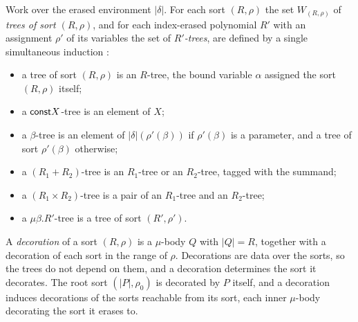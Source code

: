 \begin{definition}
\label{def:polynomial-types:trees}
Work over the erased environment $|\delta|$. For each sort $(R, \rho)$ the set $W_{(R,\rho)}$ of
\emph{trees of sort $(R, \rho)$}, and for each index-erased polynomial $R'$ with an assignment $\rho'$
of its variables the set of \emph{$R'$-trees}, are defined by a single simultaneous induction
\citep{abbott2004}:
\begin{itemize}
\item a tree of sort $(R, \rho)$ is an $R$-tree, the bound variable $\alpha$ assigned the sort
  $(R, \rho)$ itself;
\item a $\mathsf{const} X$-tree is an element of $X$;
\item a $\beta$-tree is an element of $|\delta|(\rho'(\beta))$ if $\rho'(\beta)$ is a parameter, and a
  tree of sort $\rho'(\beta)$ otherwise;
\item a $(R_1 + R_2)$-tree is an $R_1$-tree or an $R_2$-tree, tagged with the summand;
\item a $(R_1 \times R_2)$-tree is a pair of an $R_1$-tree and an $R_2$-tree;
\item a $\mu\beta.R'$-tree is a tree of sort $(R', \rho')$.
\end{itemize}
\end{definition}

\begin{definition}[Decoration]
\label{def:polynomial-types:decoration}
A \emph{decoration} of a sort $(R, \rho)$ is a $\mu$-body $Q$ with $|Q| = R$, together with a
decoration of each sort in the range of $\rho$. Decorations are data over the sorts, so the trees do
not depend on them, and a decoration determines the sort it decorates. The root sort $(|P|, \rho_0)$
is decorated by $P$ itself, and a decoration induces decorations of the sorts reachable from its
sort, each inner $\mu$-body decorating the sort it erases to.
\end{definition}

